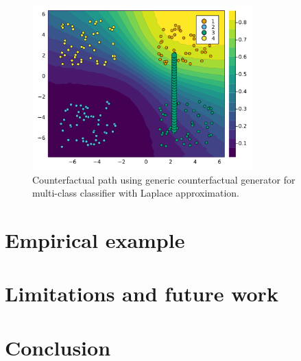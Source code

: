 \documentclass[
  letterpaper,
  DIV=11,
  numbers=noendperiod]{scrartcl}
\begin{document}
\begin{figure}

{\centering \includegraphics[width=3.33333in,height=2.5in]{www/ce_multi_laplace.png}

}

\caption{\label{fig-multi-laplace}Counterfactual path using generic
counterfactual generator for multi-class classifier with Laplace
approximation.}

\end{figure}

\hypertarget{empirical-example}{%
\section{Empirical example}\label{empirical-example}}

\hypertarget{limitations-and-future-work}{%
\section{Limitations and future
work}\label{limitations-and-future-work}}

\hypertarget{conclusion}{%
\section{Conclusion}\label{conclusion}}
\end{document}
